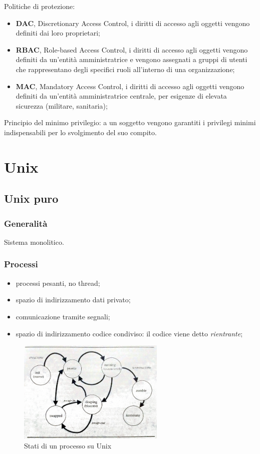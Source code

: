 \documentclass[12pt,a4paper]{article}
\begin{document}
Politiche di protezione:
\begin{itemize}
  \item \textbf{DAC}, Discretionary Access Control, i diritti di accesso
    agli oggetti vengono definiti dai loro proprietari;
  \item \textbf{RBAC}, Role-based Access Control, i diritti di accesso
    agli oggetti vengono definiti da un'entità amministratrice e vengono
    assegnati a gruppi di utenti che rappresentano degli specifici ruoli
    all'interno di una organizzazione;
  \item \textbf{MAC}, Mandatory Access Control, i diritti di accesso
    agli oggetti vengono definiti da un'entità amministratrice centrale,
    per esigenze di elevata sicurezza (militare, sanitaria);
\end{itemize}

Principio del minimo privilegio: a un soggetto vengono garantiti
i privilegi minimi indispensabili per lo svolgimento del suo compito.


\section{Unix}
\subsection{Unix puro}
\subsubsection{Generalità}
Sistema monolitico.

\subsubsection{Processi}
\begin{itemize}
  \item processi pesanti, no thread;
  \item spazio di indirizzamento dati privato;
  \item comunicazione tramite segnali;
  \item spazio di indirizzamento codice condiviso: il codice viene detto
    \emph{rientrante};
\end{itemize}

\begin{figure}[H]
  \centering
  \includegraphics[width=7cm]{img/unix/stati-processo.png}
  \caption{Stati di un processo su Unix}
\end{figure}
\end{document}

